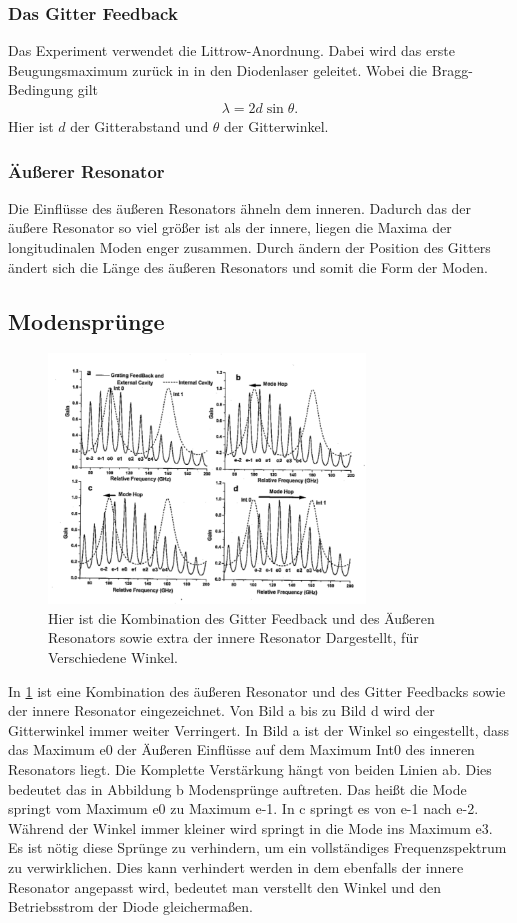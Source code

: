 \subsubsection{Das Gitter Feedback}
Das Experiment verwendet die Littrow-Anordnung.
Dabei wird das erste Beugungsmaximum zurück in in den Diodenlaser geleitet.
Wobei die Bragg-Bedingung gilt
\begin{align}
	\lambda = 2d\sin\theta.
\end{align}
Hier ist $d$ der Gitterabstand und $\theta$ der Gitterwinkel.
\subsubsection{Äußerer Resonator}
Die Einflüsse des äußeren Resonators ähneln dem inneren. 
Dadurch das der äußere Resonator so viel größer ist als der innere, liegen die Maxima der longitudinalen Moden enger zusammen.
Durch ändern der Position des Gitters ändert sich die Länge des äußeren Resonators und somit die Form der Moden.
\subsection{Modensprünge}
\begin{figure}[h!]
	\centering
	\includegraphics[width = 0.75\textwidth, angle = 1]{../Grafiken/Moden_Spruenge.pdf}
	\caption{Hier ist die Kombination des Gitter Feedback und des Äußeren Resonators sowie extra der innere Resonator Dargestellt, für Verschiedene Winkel.\cite{V60}\label{fig:Moden_Spruenge}}
\end{figure}
In \cref{fig:Moden_Spruenge} ist eine Kombination des äußeren Resonator und des Gitter Feedbacks sowie der innere Resonator eingezeichnet.
Von Bild a bis zu Bild d wird der Gitterwinkel immer weiter Verringert.
In Bild a ist der Winkel so eingestellt, dass das Maximum e0 der Äußeren Einflüsse auf dem Maximum Int0 des inneren Resonators liegt.
Die Komplette Verstärkung hängt von beiden Linien ab.
Dies bedeutet das in Abbildung b Modensprünge auftreten.
Das heißt die Mode springt vom Maximum e0 zu Maximum e-1.
In c springt es von e-1 nach e-2.
Während der Winkel immer kleiner wird springt in die Mode ins Maximum e3.\\
Es ist nötig diese Sprünge zu verhindern, um ein vollständiges Frequenzspektrum zu verwirklichen.
Dies kann verhindert werden in dem ebenfalls der innere Resonator angepasst wird, bedeutet man verstellt den Winkel und den Betriebsstrom der Diode gleichermaßen.